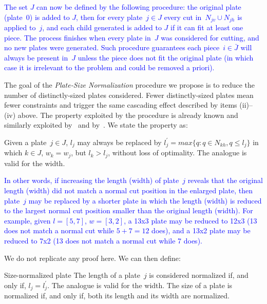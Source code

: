 \documentclass[ppgc,tese,english,formais,babel]{iiufrgs}
\newif\iffinalversion
\newcommand{\newtext}[1]{\iffinalversion%
#1%
\else%
\textcolor{blue}{#1}%
\fi%
}
\begin{document}
\newtext{
The set \(J\) can now be defined by the following procedure: the original plate (plate~\(0\)) is added to \(J\), then for every plate~\(j \in J\) every cut in~\(N_{jv} \cup N_{jh}\) is applied to~\(j\), and each child generated is added to \(J\) if it can fit at least one piece.
The process finishes when every plate in~\(J\) was considered for cutting, and no new plates were generated.
Such procedure guarantees each piece~\(i \in \bar{J}\) will always be present in~\(J\) unless the piece does not fit the original plate (in which case it is irrelevant to the problem and could be removed a priori).
}

The goal of the \emph{Plate-Size Normalization} procedure we propose is to reduce the number of distinctly-sized plates considered.
Fewer distinctly-sized plates mean fewer constraints and trigger the same cascading effect described by items (ii)--(iv) above.
The property exploited by the procedure is already known and similarly exploited by~\citet{alvarez:2009} and by~\citet{dolatabadi:2012}.
We state the property as:

\begin{proposition}
\label{pro:normalization}
Given a plate~\(j \in J\), \(l_j\) may always be replaced by \(l^\prime_j = max\{q : q \in N_{kh}, q \leq l_j\}\) in which \(k \in J\), \(w_k = w_j\), but \(l_k > l_j\), without loss of optimality.
The analogue is valid for the width.
\end{proposition}

\newtext{In other words, if increasing the length (width) of plate~\(j\) reveals that the original length (width) did not match a normal cut position in the enlarged plate, then plate~\(j\) may be replaced by a shorter plate in which the length (width) is reduced to the largest normal cut position smaller than the original length (width). For example, given \(l = [5, 7]\), \(w = [3, 2]\), a 13x3 plate may be reduced to 12x3 (13 does not match a normal cut while \(5 + 7 = 12\) does), and a 13x2 plate may be reduced to 7x2 (13 does not match a normal cut while 7 does).}
We do not replicate any proof here. We can then define:

\begin{definition}{Size-normalized plate}
The length of a plate~\(j\) is considered normalized if, and only if, \(l_j = l^\prime_j\).
The analogue is valid for the width.
The size of a plate is normalized if, and only if, both its length and its width are normalized.
\end{definition}
\end{document}
